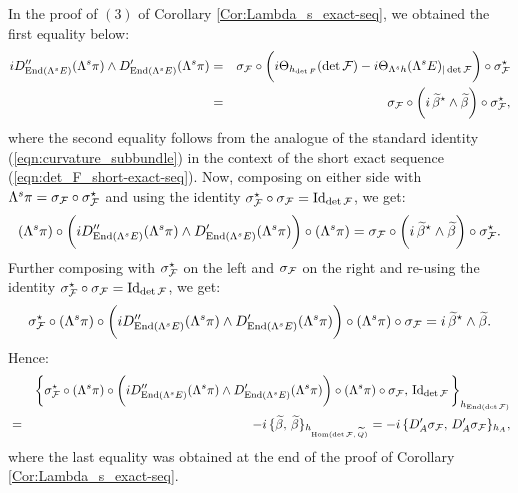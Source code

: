 \documentclass[12pt]{article}
\begin{document}
In the proof of $(3)$ of Corollary \ref{Cor:Lambda_s_exact-seq}, we obtained the first equality below: \begin{eqnarray*}iD''_{\operatorname{End}(\Lambda^sE)}(\Lambda^s\pi)\wedge D'_{\operatorname{End}(\Lambda^sE)}(\Lambda^s\pi) & = & \sigma_{\cal F}\circ\bigg(i\Theta_{h_{\det F}}(\det{\cal F}) - i\Theta_{\Lambda^sh}(\Lambda^sE)_{|\det {\cal F}}\bigg)\circ\sigma_{\cal F}^\star \\
  & = & \sigma_{\cal F}\circ\bigg(i\,\widetilde\beta^\star\wedge\widetilde\beta\bigg)\circ\sigma_{\cal F}^\star,\end{eqnarray*} where the second equality follows from the analogue of the standard identity (\ref{eqn:curvature_subbundle}) in the context of the short exact sequence (\ref{eqn:det_F_short-exact-seq}). Now, composing on either side with $\Lambda^s\pi = \sigma_{\cal F}\circ\sigma_{\cal F}^\star$ and using the identity $\sigma_{\cal F}^\star\circ\sigma_{\cal F} = \operatorname{Id}_{\det{\cal F}}$, we get: \begin{eqnarray*}(\Lambda^s\pi)\circ\bigg(iD''_{\operatorname{End}(\Lambda^sE)}(\Lambda^s\pi)\wedge D'_{\operatorname{End}(\Lambda^sE)}(\Lambda^s\pi)\bigg)\circ(\Lambda^s\pi) =  \sigma_{\cal F}\circ\bigg(i\,\widetilde\beta^\star\wedge\widetilde\beta\bigg)\circ\sigma_{\cal F}^\star.\end{eqnarray*} Further composing with $\sigma_{\cal F}^\star$ on the left and $\sigma_{\cal F}$ on the right and re-using the identity $\sigma_{\cal F}^\star\circ\sigma_{\cal F} = \operatorname{Id}_{\det{\cal F}}$, we get: \begin{eqnarray*}\sigma_{\cal F}^\star\circ(\Lambda^s\pi)\circ\bigg(iD''_{\operatorname{End}(\Lambda^sE)}(\Lambda^s\pi)\wedge D'_{\operatorname{End}(\Lambda^sE)}(\Lambda^s\pi)\bigg)\circ(\Lambda^s\pi)\circ\sigma_{\cal F} =  i\,\widetilde\beta^\star\wedge\widetilde\beta.\end{eqnarray*} Hence: \begin{eqnarray*} & & \bigg\{\sigma_{\cal F}^\star\circ(\Lambda^s\pi)\circ\bigg(iD''_{\operatorname{End}(\Lambda^sE)}(\Lambda^s\pi)\wedge D'_{\operatorname{End}(\Lambda^sE)}(\Lambda^s\pi)\bigg)\circ(\Lambda^s\pi)\circ\sigma_{\cal F},\,\operatorname{Id}_{\det{\cal F}}\bigg\}_{h_{\operatorname{End}({\det\cal F})}} \\
  & = & -i\,\{\widetilde\beta,\,\widetilde\beta\}_{h_{\operatorname{Hom}(\det{\cal F},\,\widetilde{Q})}} = -i\,\{D'_A\sigma_{\cal F},\,D'_A\sigma_{\cal F}\}_{h_A},\end{eqnarray*} where the last equality was obtained at the end of the proof of Corollary \ref{Cor:Lambda_s_exact-seq}.
\end{document}
